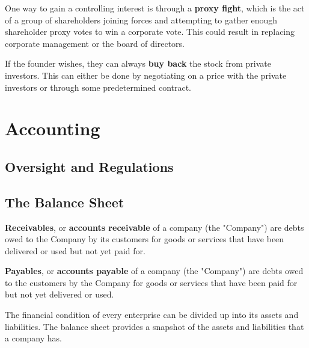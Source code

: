 \documentclass{article}
\begin{document}
    \begin{definition}
      \label{def:proxy-fight}
      One way to gain a controlling interest is through a \textbf{proxy fight}, which is the act of a group of shareholders joining forces and attempting to gather enough shareholder proxy votes to win a corporate vote. This could result in replacing corporate management or the board of directors. 
    \end{definition}

    \begin{definition}
      \label{def:stock-buyback}
      If the founder wishes, they can always \textbf{buy back} the stock from private investors. This can either be done by negotiating on a price with the private investors or through some predetermined contract.  
    \end{definition}

\section{Accounting} 

  \subsection{Oversight and Regulations}

  \subsection{The Balance Sheet}

    \begin{definition}
      \label{def:receivables-payables}
      \textbf{Receivables}, or \textbf{accounts receivable} of a company (the "Company") are debts owed to the Company by its customers for goods or services that have been delivered or used but not yet paid for. 

      \textbf{Payables}, or \textbf{accounts payable} of a company (the "Company") are debts owed to the customers by the Company for goods or services that have been paid for but not yet delivered or used. 
    \end{definition}

    The financial condition of every enterprise can be divided up into its assets and liabilities. The balance sheet provides a snapshot of the assets and liabilities that a company has. 
\end{document}
